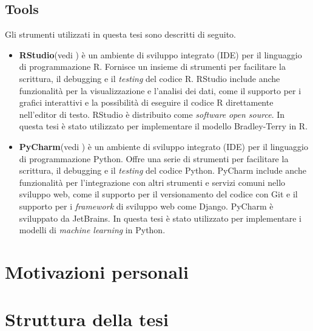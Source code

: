 \subsection{Tools}
Gli strumenti utilizzati in questa tesi sono descritti di seguito.
\begin{itemize}
	\item \textbf{RStudio}(vedi \textit{\cite{rstudio}}) è un ambiente di sviluppo integrato (IDE) per il linguaggio di programmazione R. Fornisce un insieme di strumenti per facilitare la scrittura, il debugging e il \emph{testing} del codice R. RStudio include anche funzionalità per la visualizzazione e l'analisi dei dati, come il supporto per i grafici interattivi e la possibilità di eseguire il codice R direttamente nell'editor di testo. RStudio è distribuito come \emph{software} \emph{open source}. In questa tesi è stato utilizzato per implementare il modello Bradley-Terry in R.
	\item \textbf{PyCharm}(vedi \textit{\cite{pycharm}}) è un ambiente di sviluppo integrato (IDE) per il linguaggio di programmazione Python. Offre una serie di strumenti per facilitare la scrittura, il debugging e il \emph{testing} del codice Python. PyCharm include anche funzionalità per l'integrazione con altri strumenti e servizi comuni nello sviluppo web, come il supporto per il versionamento del codice con Git e il supporto per i \emph{framework} di sviluppo web come Django. PyCharm  è sviluppato da JetBrains. In questa tesi è stato utilizzato per implementare i modelli di \emph{machine learning} in Python.
\end{itemize}

\section{Motivazioni personali}

\section{Struttura della tesi}






\begin{comment}
\begin{figure}[h]
	\begin{center}
		\texttt{[image: Logo\_azzurrodigite.png]}
		\caption{Logo di AzzurroDigitale}
	\end{center}
\end{figure}	contenuto...
\end{comment}






    
    
    
